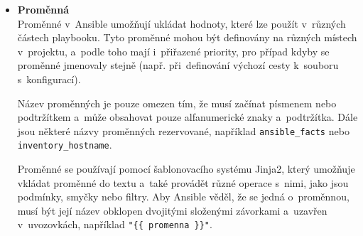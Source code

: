 \begin{itemize}
    Jednotlivé adresáře v~roli mají specifický účel:
    \begin{itemize}
        \item \textbf{tasks} - obsahuje hlavní úlohy, které se mají provést, obvykle v~souboru \texttt{main.yml}
        \item \textbf{handlers} - obsahuje úlohy, které se spustí pouze v~případě, že jsou "vyvolány" z~jiných úloh, například pro restart služby po změně konfigurace
        \item \textbf{templates} - obsahuje šablony, které se používají pro generování konfiguračních souborů na základě proměnných
        \item \textbf{files} - obsahuje statické soubory, které se mají zkopírovat na řízené uzly
        \item \textbf{vars} - obsahuje proměnné, které se mají použít v~souboru \texttt{main.yml}
        \item \textbf{defaults} - obsahuje proměnné, které se mají použít v~souboru \texttt{main.yml}, ale s~nižší prioritou než proměnné v~adresáři~\texttt{vars}
        \item \textbf{meta} - obsahuje metadata o~roli, jako jsou závislosti na jiných rolích
        \item \textbf{library} - obsahuje vlastní moduly, které mohou být použity v~úlohách
        \item \textbf{module\_utils} - obsahuje pomocné funkce pro vlastní moduly
        \item \textbf{lookup\_plugins} - obsahuje vlastní lookup pluginy, které umožňují získávat data z~různých zdrojů
    \end{itemize}

    \item \textbf{Proměnná} \\
    Proměnné v~Ansible umožňují ukládat hodnoty, které lze použít v~různých částech playbooku. 
    Tyto proměnné mohou být definovány na různých místech v~projektu, a~podle toho mají i~přiřazené priority, pro případ kdyby se proměnné jmenovaly stejně (např. při~definování výchozí cesty k~souboru s~konfigurací).  \cite{ansibledocs}

    Název proměnných je pouze omezen tím, že musí začínat písmenem nebo podtržítkem a~může obsahovat pouze alfanumerické znaky a~podtržítka.
    Dále jsou některé názvy proměnných rezervované, například \texttt{ansible\_facts} nebo \texttt{inventory\_hostname}. \cite{ansibledocs}
    
    Proměnné se používají pomocí šablonovacího systému Jinja2, který umožňuje vkládat proměnné do textu a~také provádět různé operace s~nimi, jako jsou podmínky, smyčky nebo filtry.
    Aby Ansible věděl, že se jedná o~proměnnou, musí být její název obklopen dvojitými složenými závorkami a~uzavřen v~uvozovkách, například \texttt{"\{\{ promenna \}\}"}. \cite{ansibledocs}


\end{itemize}

